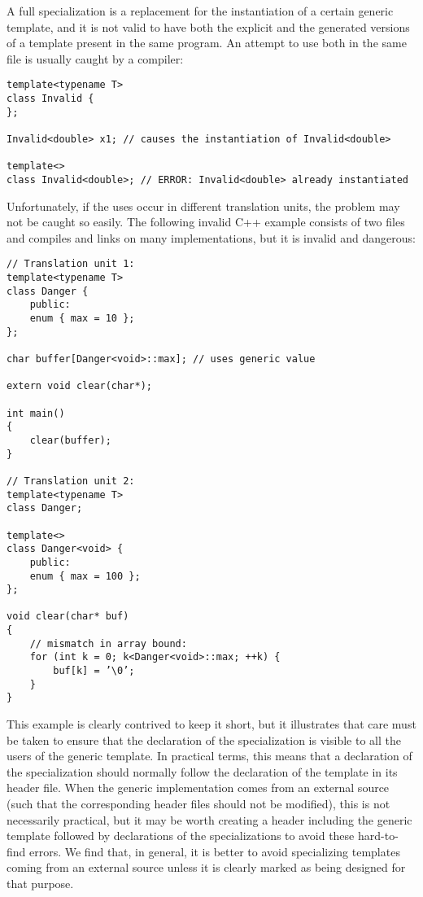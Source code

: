 A full specialization is a replacement for the instantiation of a certain generic template, and it is not valid to have both the explicit and the generated versions of a template present in the same program. An attempt to use both in the same file is usually caught by a compiler:

\begin{lstlisting}[style=styleCXX]
template<typename T>
class Invalid {
};

Invalid<double> x1; // causes the instantiation of Invalid<double>

template<>
class Invalid<double>; // ERROR: Invalid<double> already instantiated
\end{lstlisting}

Unfortunately, if the uses occur in different translation units, the problem may not be caught so easily. The following invalid C++ example consists of two files and compiles and links on many implementations, but it is invalid and dangerous:

\begin{lstlisting}[style=styleCXX]
// Translation unit 1:
template<typename T>
class Danger {
	public:
	enum { max = 10 };
};

char buffer[Danger<void>::max]; // uses generic value

extern void clear(char*);

int main()
{
	clear(buffer);
}

// Translation unit 2:
template<typename T>
class Danger;

template<>
class Danger<void> {
	public:
	enum { max = 100 };
};

void clear(char* buf)
{
	// mismatch in array bound:
	for (int k = 0; k<Danger<void>::max; ++k) {
		buf[k] = ’\0’;
	}
}
\end{lstlisting}

This example is clearly contrived to keep it short, but it illustrates that care must be taken to ensure that the declaration of the specialization is visible to all the users of the generic template. In practical terms, this means that a declaration of the specialization should normally follow the declaration of the template in its header file. When the generic implementation comes from an external source (such that the corresponding header files should not be modified), this is not necessarily practical, but it may be worth creating a header including the generic template followed by declarations of the specializations to avoid these hard-to-find errors. We find that, in general, it is better to avoid specializing templates coming from an external source unless it is clearly marked as being designed for that purpose.

